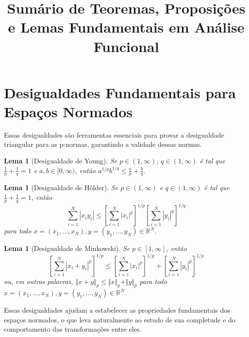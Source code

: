 \documentclass[12pt]{article}
\newtheorem{lemma}[theorem]{Lema}
\begin{document}
\title{Sumário de Teoremas, Proposições e Lemas Fundamentais em Análise Funcional}
\author{}
\date{}

\section{Desigualdades Fundamentais para Espaços Normados}
\begin{multicols}{3}
Essas desigualdades são ferramentas essenciais para provar a desigualdade triangular para as p-normas, garantindo a validade dessas normas.

\begin{lemma}[Desigualdade de Young]
Se $p \in (1, \infty)$, $q \in (1, \infty)$ é tal que $\frac{1}{p} + \frac{1}{q} = 1$ e $a, b \in [0, \infty)$, então $a^{1/p} b^{1/q} \le \frac{a}{p} + \frac{b}{q}$.
\end{lemma}

\begin{lemma}[Desigualdade de Hölder]
Se $p \in (1, \infty)$ e $q \in (1, \infty)$ é tal que $\frac{1}{p} + \frac{1}{q} = 1$, então
\[
\sum_{i=1}^{N} |x_i y_i| \le \left[ \sum_{i=1}^{N} |x_i|^p \right]^{1/p} \left[ \sum_{i=1}^{N} |y_i|^q \right]^{1/q}
\]
para todo $x = (x_1, \dots, x_N), y = (y_1, \dots, y_N) \in \mathbb{R}^N$.
\end{lemma}

\begin{lemma}[Desigualdade de Minkowski]
Se $p \in [1, \infty]$, então
\[
\left[ \sum_{i=1}^{N} |x_i + y_i|^p \right]^{1/p} \le \left[ \sum_{i=1}^{N} |x_i|^p \right]^{1/p} + \left[ \sum_{i=1}^{N} |y_i|^p \right]^{1/p}
\]
ou, em outras palavras, $\Vert x + y \Vert_p \le \Vert x \Vert_p + \Vert y \Vert_p$ para todo $x = (x_1, \dots, x_N), y = (y_1, \dots, y_N) \in \mathbb{R}^N$.
\end{lemma}

Essas desigualdades ajudam a estabelecer as propriedades fundamentais dos espaços normados, o que leva naturalmente ao estudo de sua completude e do comportamento das transformações entre eles.
\end{multicols}
\end{document}
